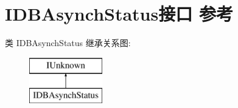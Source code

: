 \hypertarget{interface_i_d_b_asynch_status}{}\section{I\+D\+B\+Asynch\+Status接口 参考}
\label{interface_i_d_b_asynch_status}
类 I\+D\+B\+Asynch\+Status 继承关系图\+:\begin{figure}[H]
\begin{center}
\leavevmode
\includegraphics[height=2.000000cm]{interface_i_d_b_asynch_status}
\end{center}
\end{figure}

